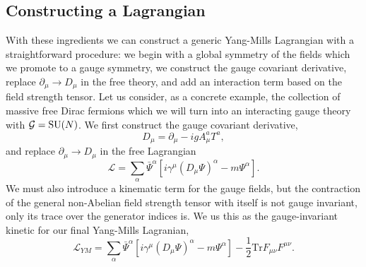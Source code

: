 \subsection{Constructing a Lagrangian}
With these ingredients we can construct a generic Yang-Mills Lagrangian with a straightforward procedure: we begin with a global symmetry of the fields which we promote to a gauge symmetry, we construct the gauge covariant derivative, replace $\partial_{\mu} \rightarrow D_{\mu}$ in the free theory, and add an interaction term based on the field strength tensor. 
Let us consider, as a concrete example, the collection of massive free Dirac fermions which we will turn into an interacting gauge theory with $\mathcal{G} = {\mathrm{SU}(N)}$.
We first construct the gauge covariant derivative, 
\begin{equation}
    \label{eq:theory:generic_SUN_Dmu}
    D_{\mu} = \partial_{\mu} - igA_{\mu}^{a} T^{a},
\end{equation}
and replace $\partial_{\mu} \rightarrow D_{\mu}$ in the free Lagrangian
\begin{equation}
    \label{eq:theory:int_dirac_no_gauge_dynamics}
    \mathcal{L} = \sum_{\alpha} \bar{\Psi}^{\alpha}[i\gamma^{\mu}(D_{\mu}\Psi)^{\alpha} - m\Psi^{\alpha}].
\end{equation}
We must also introduce a kinematic term for the gauge fields, but the contraction of the general non-Abelian field strength tensor with itself is not gauge invariant, only its trace over the generator indices is. 
We us this as the gauge-invariant kinetic for our final Yang-Mills Lagranian,
\begin{equation}
    \label{eq:theory:int_dirac_gauge_dynamics}
    \mathcal{L}_{YM} = \sum_{\alpha} \bar{\Psi}^{\alpha}[i\gamma^{\mu}(D_{\mu}\Psi)^{\alpha} - m\Psi^{\alpha}] - \frac{1}{2}\mathrm{Tr}F_{\mu\nu}F^{\mu\nu}.
\end{equation}
%
%

